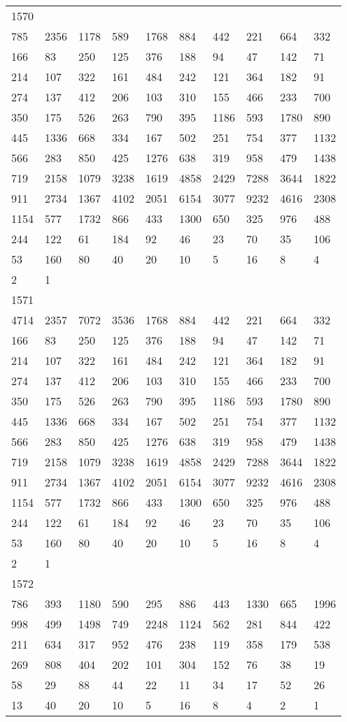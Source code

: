 \begin{longtable}{*{10}{l}}
1570&&&&&&&&&\\
785& 2356& 1178& 589& 1768& 884& 442& 221& 664& 332\\
166& 83& 250& 125& 376& 188& 94& 47& 142& 71\\
214& 107& 322& 161& 484& 242& 121& 364& 182& 91\\
274& 137& 412& 206& 103& 310& 155& 466& 233& 700\\
350& 175& 526& 263& 790& 395& 1186& 593& 1780& 890\\
445& 1336& 668& 334& 167& 502& 251& 754& 377& 1132\\
566& 283& 850& 425& 1276& 638& 319& 958& 479& 1438\\
719& 2158& 1079& 3238& 1619& 4858& 2429& 7288& 3644& 1822\\
911& 2734& 1367& 4102& 2051& 6154& 3077& 9232& 4616& 2308\\
1154& 577& 1732& 866& 433& 1300& 650& 325& 976& 488\\
244& 122& 61& 184& 92& 46& 23& 70& 35& 106\\
53& 160& 80& 40& 20& 10& 5& 16& 8& 4\\
2& 1& \\

1571&&&&&&&&&\\
4714& 2357& 7072& 3536& 1768& 884& 442& 221& 664& 332\\
166& 83& 250& 125& 376& 188& 94& 47& 142& 71\\
214& 107& 322& 161& 484& 242& 121& 364& 182& 91\\
274& 137& 412& 206& 103& 310& 155& 466& 233& 700\\
350& 175& 526& 263& 790& 395& 1186& 593& 1780& 890\\
445& 1336& 668& 334& 167& 502& 251& 754& 377& 1132\\
566& 283& 850& 425& 1276& 638& 319& 958& 479& 1438\\
719& 2158& 1079& 3238& 1619& 4858& 2429& 7288& 3644& 1822\\
911& 2734& 1367& 4102& 2051& 6154& 3077& 9232& 4616& 2308\\
1154& 577& 1732& 866& 433& 1300& 650& 325& 976& 488\\
244& 122& 61& 184& 92& 46& 23& 70& 35& 106\\
53& 160& 80& 40& 20& 10& 5& 16& 8& 4\\
2& 1& \\

1572&&&&&&&&&\\
786& 393& 1180& 590& 295& 886& 443& 1330& 665& 1996\\
998& 499& 1498& 749& 2248& 1124& 562& 281& 844& 422\\
211& 634& 317& 952& 476& 238& 119& 358& 179& 538\\
269& 808& 404& 202& 101& 304& 152& 76& 38& 19\\
58& 29& 88& 44& 22& 11& 34& 17& 52& 26\\
13& 40& 20& 10& 5& 16& 8& 4& 2& 1\\


\end{longtable}

